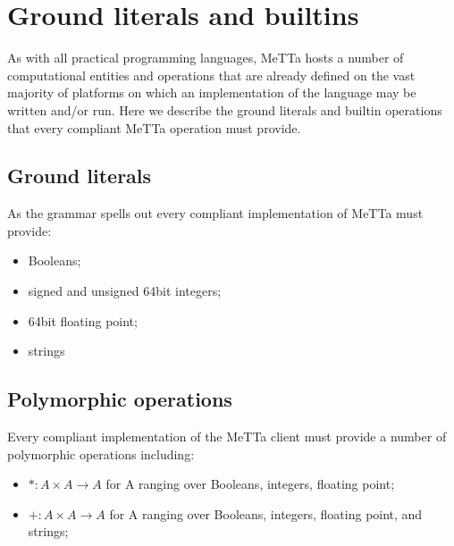 \section{Ground literals and builtins}
As with all practical programming languages, MeTTa hosts a number of computational entities and operations that are already defined on the vast majority of platforms on which an implementation of the language may be written and/or run. Here we describe the ground literals and builtin operations that every compliant MeTTa operation must provide.
\subsection{Ground literals}
As the grammar spells out every compliant implementation of MeTTa must provide:

\begin{itemize}
  \item Booleans;
  \item signed and unsigned 64bit integers;
  \item 64bit floating point;
  \item strings
\end{itemize}

\subsection{Polymorphic operations}
Every compliant implementation of the MeTTa client must provide a number of polymorphic operations including:

\begin{itemize}
  \item $* : A \times A \rightarrow A$ for A ranging over Booleans, integers, floating point;
  \item $+ : A \times A \rightarrow A$ for A ranging over Booleans, integers, floating point, and strings;
\end{itemize}

